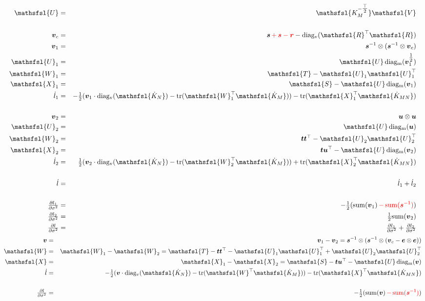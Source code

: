 \documentclass[12pt]{article}
\newcommand{\red}{\textcolor{red}}
\newcommand{\blue}{\textcolor{blue}}
\newcommand{\onehalf}{\tfrac{1}{2}}
\newcommand{\mat}[1]{\mbox{$\mathsfsl{#1}$}}
\newcommand{\myvec}[1]{\mbox{\boldmath$#1$}}
\newcommand{\diagv}[1]{\mathrm{diag_v}(#1)}
\newcommand{\diagm}[1]{\mathrm{diag_m}(#1)}
\newcommand{\trace}[1]{\mathrm{tr}(#1)}
\newcommand{\transv}[1]{\myvec{#1}^\top}
\newcommand{\transm}[1]{\mat{#1}^\top}
\newcommand{\icholt}[1]{\mat{#1^{-\tfrac{\top}{2}}}}
\newcommand{\dKm}{\mat{\dot{K}_M}}
\newcommand{\dKn}{\mat{\dot{K}_N}}
\newcommand{\dKmn}{\mat{\dot{K}_{MN}}}
\newcommand{\dl}{\dot{l}}
\newcommand{\vece}{\myvec{e}}
\newcommand{\vecr}{\myvec{r}}
\newcommand{\vecs}{\myvec{s}}
\newcommand{\vect}{\myvec{t}}
\newcommand{\vecu}{\myvec{u}}
\newcommand{\vecv}{\myvec{v}}
\newcommand{\vecvc}{\myvec{v}_c}
\newcommand{\vecvx}{\myvec{v}_1}
\newcommand{\vecvy}{\myvec{v}_2}
\newcommand{\vecis}{\myvec{s}^{-1}}
\newcommand{\matR}{\mat{R}}
\newcommand{\matS}{\mat{S}}
\newcommand{\matT}{\mat{T}}
\newcommand{\matU}{\mat{U}}
\newcommand{\matUx}{\mat{U}_1}
\newcommand{\matUy}{\mat{U}_2}
\newcommand{\matW}{\mat{W}}
\newcommand{\matWx}{\mat{W}_1}
\newcommand{\matX}{\mat{X}}
\newcommand{\matXx}{\mat{X}_1}
\newcommand{\matWy}{\mat{W}_2}
\newcommand{\matXy}{\mat{X}_2}
\begin{document}
\begin{eqnarray*}
\matU & = & \icholt{K_M}\mat{V} \\
\\
\vecvc & = & \vecs \red{\, + \, \vecs - \vecr} - \diagv{\transm{R}\matR} \\
\vecvx & = & \vecis \otimes (\vecis \otimes \vecvc) \\
\matUx & = & \matU \, \diagm{\vecvx^{\onehalf}} \\
\matWx & = & \matT - \matUx{\matU}_1^\top \\
\matXx & = & \matS - \matU\,\diagm{\vecvx} \\
\dl_1 & = & -\onehalf(\vecvx \cdot \diagv{\dKn} - \trace{\transm{W}_1\dKm}) - \trace{\transm{X}_1\dKmn} \\
\\
\vecvy & = & \vecu \otimes \vecu \\
\matUy & = & \matU \, \diagm{\vecu} \\
\matWy & = & \vect \vect^\top - \matUy\matUy^\top \\
\matXy & = & \vect\vecu^\top - \matU\,\diagm{\vecvy} \\
\dl_2 & = & \onehalf(\vecvy \cdot \diagv{\dKn} - \trace{\transm{W}_2\dKm}) + \trace{\transm{X}_2\dKmn} \\
\\
\dl & = & \dl_1 + \dl_2 \\
\\
\tfrac{\partial l_1}{\partial\sigma^2} & = & -\onehalf(\mathrm{sum}(\vecvx) \red{\, - \, \mathrm{sum}(\vecis)}) \\
\tfrac{\partial l_2}{\partial\sigma^2} & = & \onehalf\mathrm{sum}(\vecvy) \\
\tfrac{\partial l}{\partial\sigma^2} & = & \tfrac{\partial l_1}{\partial\sigma^2} + \tfrac{\partial l_2}{\partial\sigma^2}
\end{eqnarray*}
\blue{
\begin{eqnarray*}
\vecv & = & \vecvx - \vecvy = \vecis \otimes (\vecis \otimes (\vecvc - \vece \otimes \vece)) \\
\matW & = & \matWx - \matWy = \matT - \vect \transv{t} - \matUx{\matU}_1^\top + \matUy{\matU}_2^\top \\
\matX & = & \matXx - \matXy = \matS - \vect \transv{u} - \matU\,\diagm{\vecv} \\
\dl & = & -\onehalf(\vecv \cdot \diagv{\dKn} - \trace{\transm{W}\dKm}) - \trace{\transm{X}\dKmn} \\
\\
\tfrac{\partial l}{\partial\sigma^2} & = & -\onehalf(\mathrm{sum}(\vecv) \red{\, - \, \mathrm{sum}(\vecis)}) \\
\end{eqnarray*}
}
\end{document}
